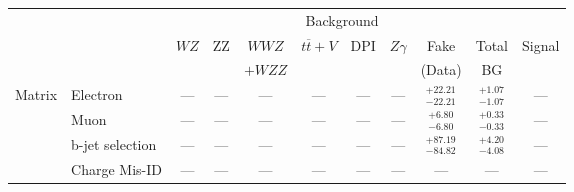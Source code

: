 \small\renewcommand{\tabcolsep}{1pt}
\begin{tabular}{|cl||ccccccc|c||c|}
\hline
 & & \multicolumn{8}{c||}{Background} & \\ 
 & & $WZ$ & ZZ & $WWZ$ & $t\overline{t}+V$ & DPI & $Z\gamma$ & Fake & Total & Signal\\ 
 & & &  & $+WZZ$ &  &  &  & (Data) & BG & \\ 
\hline\hline
\multirow{2}{*}{Matrix}
&Electron & --- & --- & --- & --- & --- & --- &  $^{+22.21}_{-22.21}$  &  $^{+1.07}_{-1.07}$  & ---\\ 
\cline{2-11}
\multirow{2}{*}{Method}
&Muon & --- & --- & --- & --- & --- & --- &  $^{+6.80}_{-6.80}$  &  $^{+0.33}_{-0.33}$  & ---\\ 
\cline{2-11}
&b-jet selection & --- & --- & --- & --- & --- & --- &  $^{+87.19}_{-84.82}$  &  $^{+4.20}_{-4.08}$  & ---\\ 
\hline
&Charge Mis-ID & --- & --- & --- & --- & --- & --- & --- & --- & ---\\ 
\hline
\end{tabular}
